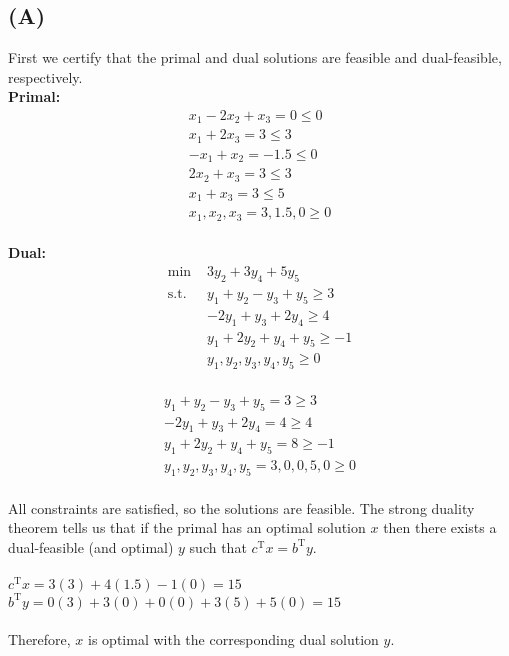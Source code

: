 \documentclass[12pt]{article}
\begin{document}
\subsection*{(A)}
First we certify that the primal and dual solutions are feasible and dual-feasible, respectively. \\
\textbf{Primal:}
\begin{align*}
    x_1 - 2x_2 + x_3 = 0 \leq 0 \\
    x_1 + 2x_3 = 3 \leq 3 \\
    -x_1 + x_2 = -1.5 \leq 0 \\
    2x_2 + x_3 = 3 \leq 3 \\
    x_1 + x_3 = 3 \leq 5 \\
    x_1, x_2, x_3 = 3, 1.5, 0 \geq 0
\end{align*}
\\
\textbf{Dual:} \\
\begin{align*}
    \text{min } & 3y_2 + 3y_4 + 5y_5 \\
    \text{s.t. } & y_1 + y_2 - y_3 + y_5 \geq 3 \\
    & -2y_1 + y_3 + 2y_4 \geq 4 \\
    & y_1 + 2y_2 + y_4 + y_5 \geq -1 \\
    & y_1, y_2, y_3, y_4, y_5 \geq 0
\end{align*}
\\
\begin{align*}
    y_1 + y_2 - y_3 + y_5 = 3 \geq 3 \\
    -2y_1 + y_3 + 2y_4 = 4 \geq 4 \\
    y_1 + 2y_2 + y_4 + y_5 = 8 \geq -1 \\
    y_1, y_2, y_3, y_4, y_5 = 3, 0, 0, 5, 0 \geq 0
\end{align*}
\\
All constraints are satisfied, so the solutions are feasible. The strong duality theorem tells us that if the primal has an optimal solution $x$ then there exists a dual-feasible (and optimal) $y$ such that $c^\text{T}x = b^\text{T}y$. \\
\\
$c^\text{T}x = 3(3) + 4(1.5) - 1(0) = 15$ \\
$b^\text{T}y = 0(3) + 3(0) + 0(0) + 3(5) + 5(0) = 15$ \\
\\
Therefore, $x$ is optimal with the corresponding dual solution $y$. \square

\newpage
\end{document}
